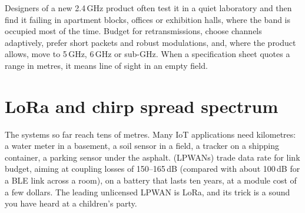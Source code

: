 
\begin{pitfall}
Designers of a new 2.4\,GHz product often test it in a quiet laboratory and then find it failing in
apartment blocks, offices or exhibition halls, where the band is occupied most of the time. Budget for
retransmissions, choose channels adaptively, prefer short packets and robust modulations, and, where
the product allows, move to 5\,GHz, 6\,GHz or sub-GHz. When a specification sheet quotes a range in
metres, it means line of sight in an empty field.
\end{pitfall}

\section{LoRa and chirp spread spectrum}
\label{sec:ch22:lora}

The systems so far reach tens of metres. Many IoT applications need kilometres: a water meter in a
basement, a soil sensor in a field, a tracker on a shipping container, a parking sensor under the
asphalt.  (LPWANs) trade data rate for link budget, aiming at
coupling losses of 150--165\,dB (compared with about 100\,dB for a BLE link across a room), on a
battery that lasts ten years, at a module cost of a few dollars. The leading unlicensed LPWAN is
LoRa, and its trick is a sound you have heard at a children's party.


